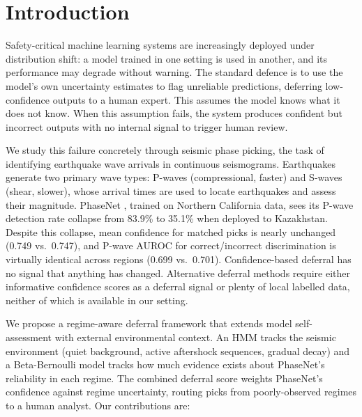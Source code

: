 \section{Introduction}
\label{sec:intro}

Safety-critical machine learning systems are increasingly deployed under distribution shift: a model trained in one setting is used in another, and its performance may degrade without warning. The standard defence is to use the model's own uncertainty estimates to flag unreliable predictions, deferring low-confidence outputs to a human expert. This assumes the model knows what it does not know. When this assumption fails, the system produces confident but incorrect outputs with no internal signal to trigger human review.

We study this failure concretely through seismic phase picking, the task of identifying earthquake wave arrivals in continuous seismograms. Earthquakes 
generate two primary wave types: P-waves (compressional, faster) and S-waves (shear, slower), whose arrival times are used to locate earthquakes and assess their magnitude. PhaseNet \citep{zhu2019phasenet}, trained on Northern California data, sees its P-wave detection rate collapse from 83.9\% to 35.1\% when deployed to Kazakhstan. Despite this collapse, mean confidence for matched picks is nearly unchanged (0.749 vs.\ 0.747), and P-wave AUROC for correct/incorrect discrimination is virtually identical across regions (0.699 vs.\ 0.701). Confidence-based deferral has no signal that anything has changed. Alternative deferral methods require either informative confidence scores as a deferral signal or plenty of local labelled data, neither of which is available in our setting.

We propose a regime-aware deferral framework that extends model self-assessment with external environmental context. An HMM tracks the seismic environment (quiet background, active aftershock sequences, gradual decay) and a Beta-Bernoulli model tracks how much evidence exists about PhaseNet's reliability in each regime. The combined deferral score weights PhaseNet's confidence against regime uncertainty, routing picks from poorly-observed regimes to a human analyst. Our contributions are:

